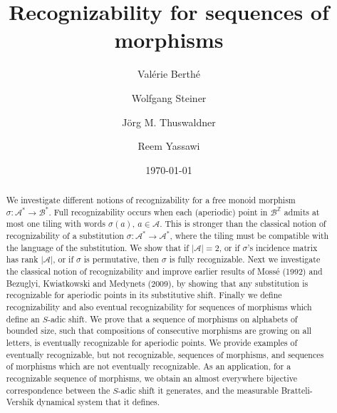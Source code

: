 \documentclass{amsart}
\title{Recognizability for sequences of morphisms}
\author[V.~Berth\'e]{Val\'erie Berth\'e}
\author[W.~Steiner]{Wolfgang Steiner}
\author[J. M. Thuswaldner]{J\"org M. Thuswaldner}
\author[R.~Yassawi]{Reem Yassawi}
\date{\today}
\theoremstyle{definition}
\theoremstyle{remark}
\numberwithin{equation}{section}
\begin{document}
\begin{abstract}
We investigate different notions of recognizability for a free monoid morphism $\sigma: \mathcal{A}^* \to \mathcal{B}^*$.
Full recognizability occurs when each (aperiodic) point in $\mathcal{B}^\mathbb{Z}$ admits at most one tiling with words $\sigma(a)$, $a \in \mathcal{A}$. 
This is stronger than the classical notion of recognizability of a substitution $\sigma: \mathcal{A}^*\to\mathcal{A}^*$, where the tiling must be compatible with the language of the substitution.
We show that if  $|\mathcal A|=2$, or if  $\sigma$'s incidence matrix has  rank $|\mathcal A|$, or if $\sigma$ is permutative, then $\sigma$ is fully recognizable. 
Next we investigate the classical notion of recognizability and  improve earlier results of Moss\'{e} (1992) and Bezuglyi, Kwiatkowski and Medynets (2009), by showing that any substitution is recognizable for aperiodic points in its substitutive shift.
Finally we define  recognizability and also eventual recognizability for sequences of morphisms which define an $S$-adic shift.  We prove that a sequence of morphisms on alphabets of bounded size, such that compositions of consecutive morphisms are growing on all letters, is eventually recognizable for aperiodic points. We provide examples of eventually recognizable, but not recognizable, sequences of morphisms, and sequences of morphisms which are not eventually recognizable.  As an application, for a  recognizable sequence of morphisms, we obtain an almost everywhere bijective correspondence between the $S$-adic shift it generates,  and the measurable Bratteli-Vershik dynamical system that it defines.
\end{abstract} 
 
\maketitle
\end{document}
